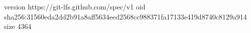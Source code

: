 version https://git-lfs.github.com/spec/v1
oid sha256:31560eda2dd2b91a8aff5634eed2568cc988371fa17133e419d8740c8129a914
size 4364
